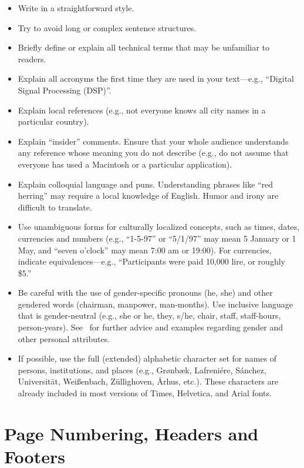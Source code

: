 \documentclass{article}
\begin{document}
\begin{itemize}
\item Write in a straightforward style.
\item Try to avoid long or complex sentence structures.
\item Briefly define or explain all technical terms that may be
  unfamiliar to readers.
\item Explain all acronyms the first time they are used in your text---e.g.,
``Digital Signal Processing (DSP)''.
\item Explain local references (e.g., not everyone knows all city
  names in a particular country).
\item Explain ``insider'' comments. Ensure that your whole audience
  understands any reference whose meaning you do not describe (e.g.,
  do not assume that everyone has used a Macintosh or a particular
  application).
\item Explain colloquial language and puns. Understanding phrases like
  ``red herring'' may require a local knowledge of English.  Humor and
  irony are difficult to translate.
\item Use unambiguous forms for culturally localized concepts, such as
  times, dates, currencies and numbers (e.g., ``1-5-97'' or ``5/1/97''
  may mean 5 January or 1 May, and ``seven o'clock'' may mean 7:00 am or
  19:00).  For currencies, indicate equivalences---e.g., ``Participants
  were paid 10,000 lire, or roughly \$5.''
\item Be careful with the use of gender-specific pronouns (he, she)
  and other gendered words (chairman, manpower, man-months). Use
  inclusive language that is gender-neutral (e.g., she or he, they,
  s/he, chair, staff, staff-hours,
  person-years). See~\cite{Schwartz:1995:GBF} for further advice and
  examples regarding gender and other personal attributes.
\item If possible, use the full (extended) alphabetic character set
  for names of persons, institutions, and places (e.g.,
  Gr{\o}nb{\ae}k, Lafreni\'ere, S\'anchez, Universit{\"a}t,
  Wei{\ss}enbach, Z{\"u}llighoven, \r{A}rhus, etc.).  These characters
  are already included in most versions of Times, Helvetica, and Arial
  fonts.
\end{itemize}

\section{Page Numbering, Headers and Footers}
\end{document}
